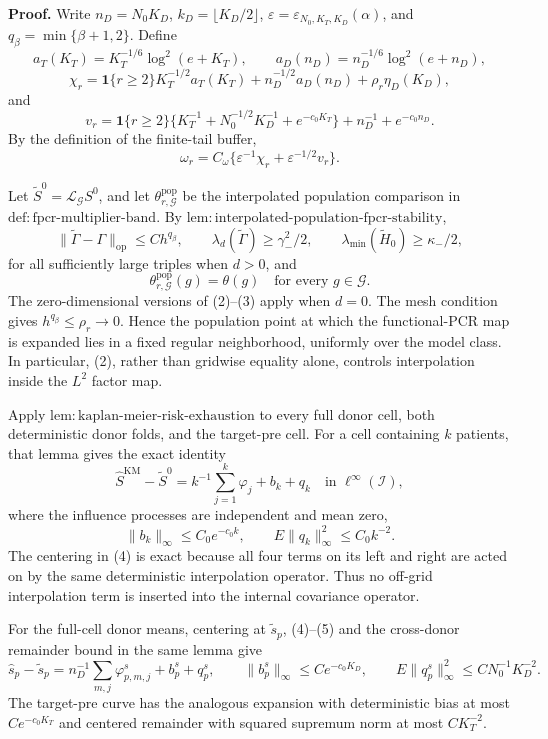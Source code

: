 \textbf{Proof.}
Write \(n_D=N_0K_D\), \(k_D=\lfloor K_D/2\rfloor\),
\(\varepsilon=\varepsilon_{N_0,K_T,K_D}(\alpha)\), and
\(q_\beta=\min\{\beta+1,2\}\).  Define
\[
 a_T(K_T)=K_T^{-1/6}\log^2(e+K_T),
 \qquad
 a_D(n_D)=n_D^{-1/6}\log^2(e+n_D),
\]
\[
 \chi_r=\mathbf 1\{r\ge2\}K_T^{-1/2}a_T(K_T)
       +n_D^{-1/2}a_D(n_D)+\rho_r\eta_D(K_D),
\]
and
\[
 v_r=\mathbf 1\{r\ge2\}
 \{K_T^{-1}+N_0^{-1/2}K_D^{-1}+e^{-c_0K_T}\}
 +n_D^{-1}+e^{-c_0n_D}.
\]
By the definition of the finite-tail buffer,
\[
 \omega_r=C_\omega\{\varepsilon^{-1}\chi_r
                   +\varepsilon^{-1/2}v_r\}.                 \tag{1}
\]

Let \(\widetilde S^0=\mathcal L_{\mathcal G}S^0\), and let
\(\theta^{\mathrm{pop}}_{r,\mathcal G}\) be the interpolated population
comparison in \(\mathrm{def:fpcr\mbox{-}multiplier\mbox{-}band}\).  By
\(\mathrm{lem:interpolated\mbox{-}population\mbox{-}fpcr\mbox{-}stability}\),
\[
 \|\widetilde\Gamma-\Gamma\|_{\mathrm{op}}
 \le C h^{q_\beta},
 \qquad
 \lambda_d(\widetilde\Gamma)\ge\gamma_-^2/2,
 \qquad
 \lambda_{\min}(\widetilde H_0)\ge\kappa_-/2,              \tag{2}
\]
for all sufficiently large triples when \(d>0\), and
\[
 \theta^{\mathrm{pop}}_{r,\mathcal G}(g)=\theta(g)
 \quad\text{for every }g\in\mathcal G.                     \tag{3}
\]
The zero-dimensional versions of (2)--(3) apply when \(d=0\).  The mesh
condition gives \(h^{q_\beta}\le\rho_r\to0\).  Hence the population point
at which the functional-PCR map is expanded lies in a fixed regular
neighborhood, uniformly over the model class.  In particular, (2), rather
than gridwise equality alone, controls interpolation inside the \(L^2\)
factor map.

Apply
\(\mathrm{lem:kaplan\mbox{-}meier\mbox{-}risk\mbox{-}exhaustion}\) to every
full donor cell, both deterministic donor folds, and the target-pre cell.
For a cell containing \(k\) patients, that lemma gives the exact identity
\[
 \widehat S^{\mathrm{KM}}-\widetilde S^0
 =k^{-1}\sum_{j=1}^k\varphi_j+b_k+q_k
 \quad\text{in }\ell^\infty(\mathcal I),                   \tag{4}
\]
where the influence processes are independent and mean zero,
\[
 \|b_k\|_\infty\le C_0e^{-c_0k},
 \qquad
 E\|q_k\|_\infty^2\le C_0k^{-2}.                           \tag{5}
\]
The centering in (4) is exact because all four terms on its left and right
are acted on by the same deterministic interpolation operator.  Thus no
off-grid interpolation term is inserted into the internal covariance
operator.

For the full-cell donor means, centering at \(\widetilde s_p\), (4)--(5)
and the cross-donor remainder bound in the same lemma give
\[
 \widehat s_p-\widetilde s_p
 =n_D^{-1}\sum_{m,j}\varphi^s_{p,m,j}+b^s_p+q^s_p,
 \qquad
 \|b^s_p\|_\infty\le C e^{-c_0K_D},
 \qquad
 E\|q^s_p\|_\infty^2\le C N_0^{-1}K_D^{-2}.                \tag{6}
\]
The target-pre curve has the analogous expansion with deterministic bias
at most \(Ce^{-c_0K_T}\) and centered remainder with squared supremum norm
at most \(CK_T^{-2}\).

